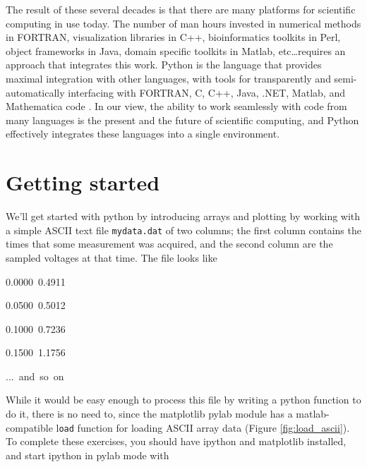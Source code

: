 The result of these several decades is that there are many platforms
for scientific computing in use today. The number of man hours invested
in numerical methods in \textsc{FORTRAN}, visualization libraries
in C++, bioinformatics toolkits in Perl, object frameworks in Java,
domain specific toolkits in Matlab, etc\dots requires an approach
that integrates this work. Python is the language that provides maximal
integration with other languages, with tools for transparently and
semi-automatically interfacing with \textsc{FORTRAN}, C, C++, Java,
.NET, Matlab, and Mathematica code \cite{Hugunin1997,Beazley1998}.
In our view, the ability to work seamlessly with code from many languages
is the present and the future of scientific computing, and Python
effectively integrates these languages into a single environment.


\section{Getting started}

We'll get started with python by introducing arrays and plotting by
working with a simple ASCII text file \texttt{mydata.dat} of two columns;
the first column contains the times that some measurement was acquired,
and the second column are the sampled voltages at that time. The file
looks like

\begin{lyxcode}
0.0000~0.4911

0.0500~0.5012

0.1000~0.7236

0.1500~1.1756

...~and~so~on
\end{lyxcode}
\noindent While it would be easy enough to process this file by writing
a python function to do it, there is no need to, since the matplotlib
pylab module has a matlab-compatible l\texttt{oad} function for loading
ASCII array data (Figure \ref{fig:load_ascii}). To complete these
exercises, you should have ipython and matplotlib installed, and start
ipython in pylab mode with 


